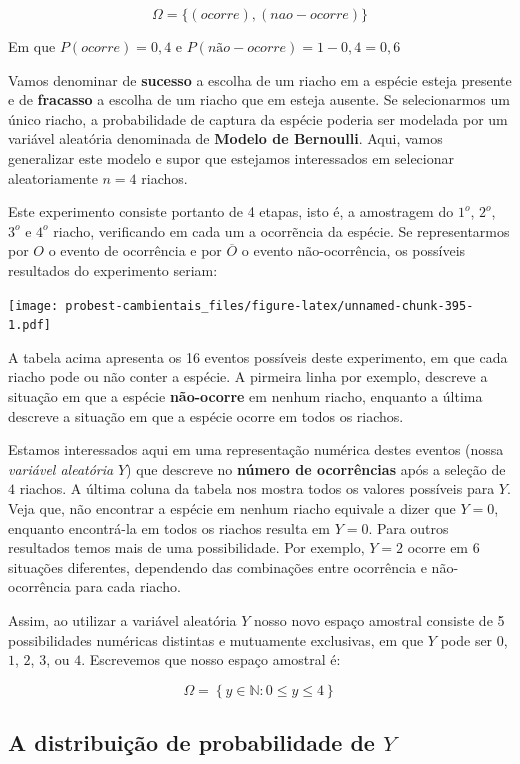 \documentclass[
]{book}
\begin{document}
\[\Omega = \{(ocorre), (nao-ocorre)\}\]

Em que \(P(ocorre) = 0,4\) e \(P(não-ocorre) = 1-0,4 = 0,6\)

Vamos denominar de \textbf{sucesso} a escolha de um riacho em a espécie esteja presente e de \textbf{fracasso} a escolha de um riacho que em esteja ausente. Se selecionarmos um único riacho, a probabilidade de captura da espécie poderia ser modelada por um variável aleatória denominada de \textbf{Modelo de Bernoulli}. Aqui, vamos generalizar este modelo e supor que estejamos interessados em selecionar aleatoriamente \(n = 4\) riachos.

Este experimento consiste portanto de 4 etapas, isto é, a amostragem do \(1^o\), \(2^o\), \(3^o\) e \(4^o\) riacho, verificando em cada um a ocorrẽncia da espécie. Se representarmos por \(O\) o evento de ocorrência e por \(\overline{O}\) o evento não-ocorrência, os possíveis resultados do experimento seriam:

\texttt{[image: probest-cambientais\_files/figure-latex/unnamed-chunk-395-1.pdf]}

A tabela acima apresenta os 16 eventos possíveis deste experimento, em que cada riacho pode ou não conter a espécie. A pirmeira linha por exemplo, descreve a situação em que a espécie \textbf{não-ocorre} em nenhum riacho, enquanto a última descreve a situação em que a espécie ocorre em todos os riachos.

Estamos interessados aqui em uma representação numérica destes eventos (nossa \emph{variável aleatória} \(Y\)) que descreve no \textbf{número de ocorrências} após a seleção de \(4\) riachos. A última coluna da tabela nos mostra todos os valores possíveis para \(Y\). Veja que, não encontrar a espécie em nenhum riacho equivale a dizer que \(Y = 0\), enquanto encontrá-la em todos os riachos resulta em \(Y = 0\). Para outros resultados temos mais de uma possibilidade. Por exemplo, \(Y = 2\) ocorre em 6 situações diferentes, dependendo das combinações entre ocorrência e não-ocorrência para cada riacho.

Assim, ao utilizar a variável aleatória \(Y\) nosso novo espaço amostral consiste de 5 possibilidades numéricas distintas e mutuamente exclusivas, em que \(Y\) pode ser \(0\), \(1\), \(2\), \(3\), ou \(4\). Escrevemos que nosso espaço amostral é:

\[\Omega = \left\{ y \in \mathbb{N}: 0 \le y \le 4 \right\}\]

\hypertarget{a-distribuiuxe7uxe3o-de-probabilidade-de-y}{%
\subsection*{\texorpdfstring{A distribuição de probabilidade de \(Y\)}{A distribuição de probabilidade de Y}}\label{a-distribuiuxe7uxe3o-de-probabilidade-de-y}}
\end{document}
